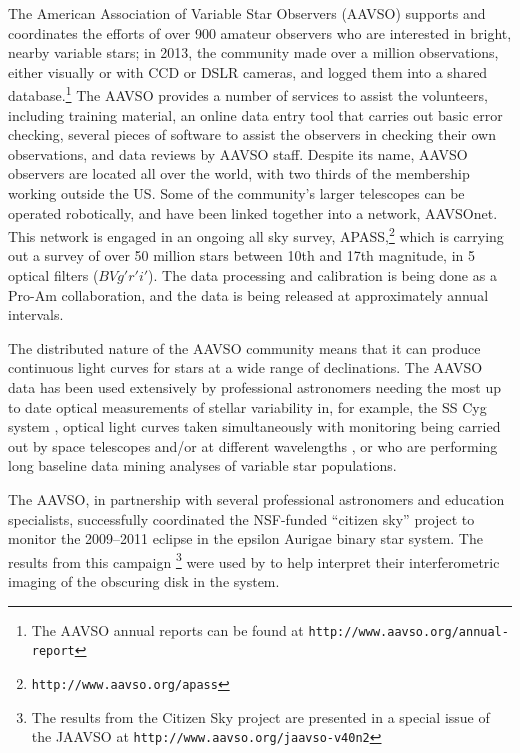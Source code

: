 \documentclass{ar2e}
\def\eg{{\it e.g.}\xspace}
\def\CaseStudy#1{\noindent{\it\bf #1 \,\,\,\,}}
\def\url#1{\texttt{#1}}
\begin{document}
\CaseStudy{Variable Star Monitoring: the AAVSO.}
The American Association of Variable Star Observers (AAVSO) supports and
coordinates the efforts of over 900 amateur observers who are interested in
bright, nearby variable stars; in 2013, the community made over a million
observations, either visually or with CCD or DSLR cameras, and logged them
into a shared database.\footnote{The AAVSO annual reports can be found at
\url{http://www.aavso.org/annual-report}} The AAVSO provides a number of
services to assist the volunteers, including training material, an online data
entry tool that carries out basic error checking, several pieces of
software to assist the observers in checking their own observations, and data
reviews by AAVSO staff. Despite its name, AAVSO observers are located all over
the world, with two thirds of the membership working outside the US. Some of
the community's larger telescopes can be operated robotically, and have been
linked together into a network, AAVSOnet. This network is engaged in an
ongoing all sky survey, APASS,\footnote{\url{http://www.aavso.org/apass}}
which is carrying out a survey of over 50 million stars between 10th and 17th
magnitude, in 5 optical filters ($BVg'r'i'$). The data processing and
calibration is being done as a Pro-Am collaboration, and the data is being
released at approximately annual intervals.

The distributed nature of the AAVSO community means that it can produce
continuous light curves for stars at a wide range of declinations. The AAVSO
data has been used extensively by professional astronomers needing the most 
up to date optical measurements of stellar variability in, for example, the 
SS Cyg system \citep{Miller-Jones++2013},  optical light curves taken
simultaneously with monitoring being carried out by space telescopes and/or at
different wavelengths \citep[see \eg][for a successful joint AAVSO--HST
program]{Szkody++2013},  or who are performing long baseline data mining
analyses of variable star populations. 

The AAVSO, in partnership with several professional astronomers and education
specialists, successfully coordinated the NSF-funded ``citizen sky'' project
to monitor the 2009--2011 eclipse in the epsilon Aurigae binary star system.
The results from this campaign  \citep{Stencel2012}\footnote{The results from
the Citizen Sky project are presented in a special issue of the JAAVSO at 
\url{http://www.aavso.org/jaavso-v40n2}} were used by \citet{Kloppenborg++2010}
to help interpret their interferometric imaging of the obscuring disk in the
system.
\end{document}
